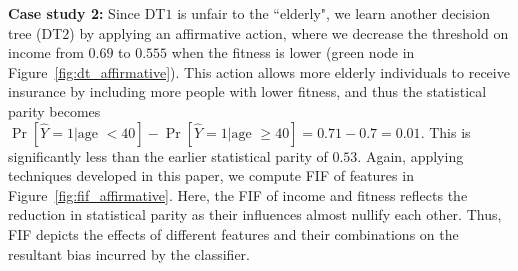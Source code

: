 \begin{example}
	\textbf{Case study 2:} Since DT$ 1 $ is unfair to the ``elderly", we learn another decision tree (DT$ 2 $) by applying an affirmative action, where we decrease the threshold on income from $ 0.69 $ to $ 0.555 $ when the fitness is lower ({\color{affirmative}green} node in Figure~\ref{fig:dt_affirmative}). This action allows more elderly individuals to receive insurance by including more people with lower fitness, and thus the statistical parity becomes $ \Pr[\widehat{Y} = 1 | \text{age } < 40] - \Pr[\widehat{Y} = 1 | \text{age } \ge 40] = 0.71 - 0.7 = 0.01$. This is significantly less than the earlier statistical parity of $ 0.53 $.	Again, applying techniques developed in this paper, we compute FIF of features in Figure~\ref{fig:fif_affirmative}. Here, the FIF of income and fitness reflects the reduction in statistical parity as their influences almost nullify each other. Thus, FIF depicts the effects of different features and their combinations on the resultant bias incurred by the classifier. %
\end{example}





